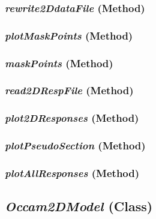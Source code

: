 \subsubsection{\textit{rewrite2DdataFile} (Method)}
\label{sssec:.modeling.occamtools.Occam2DData.rewrite2DdataFile}



\subsubsection{\textit{plotMaskPoints} (Method)}
\label{sssec:.modeling.occamtools.Occam2DData.plotMaskPoints}



\subsubsection{\textit{maskPoints} (Method)}
\label{sssec:.modeling.occamtools.Occam2DData.maskPoints}



\subsubsection{\textit{read2DRespFile} (Method)}
\label{sssec:.modeling.occamtools.Occam2DData.read2DRespFile}



\subsubsection{\textit{plot2DResponses} (Method)}
\label{sssec:.modeling.occamtools.Occam2DData.plot2DResponses}



\subsubsection{\textit{plotPseudoSection} (Method)}
\label{sssec:.modeling.occamtools.Occam2DData.plotPseudoSection}



\subsubsection{\textit{plotAllResponses} (Method)}
\label{sssec:.modeling.occamtools.Occam2DData.plotAllResponses}





\subsection{\textit{Occam2DModel} (Class)}
\label{ssec:.modeling.occamtools.Occam2DModel}



